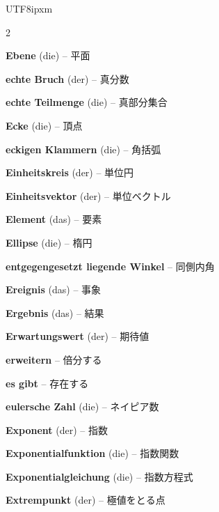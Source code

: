 \begin{CJK}{UTF8}{ipxm}
\begin{multicols}{2}
\par\nopagebreak
\textbf{Ebene} (die) -- 平面\dotfill\hyperref[e:308]{\pageref*{e:308}}\par
\textbf{echte Bruch} (der) -- 真分数\dotfill\hyperref[e:31]{\pageref*{e:31}}\par
\textbf{echte Teilmenge} (die) -- 真部分集合\dotfill\hyperref[e:99]{\pageref*{e:99}}\par
\textbf{Ecke} (die) -- 頂点\dotfill\hyperref[e:245]{\pageref*{e:245}}\par
\textbf{eckigen Klammern} (die) -- 角括弧\dotfill\hyperref[e:89]{\pageref*{e:89}}\par
\textbf{Einheitskreis} (der) -- 単位円\dotfill\hyperref[e:137]{\pageref*{e:137}}\par
\textbf{Einheitsvektor} (der) -- 単位ベクトル\dotfill\hyperref[e:303]{\pageref*{e:303}}\par
\textbf{Element} (das) -- 要素\dotfill\hyperref[e:97]{\pageref*{e:97}}\par
\textbf{Ellipse} (die) -- 楕円\dotfill\hyperref[e:314]{\pageref*{e:314}}\par
\textbf{entgegengesetzt liegende Winkel} -- 同側内角\dotfill\hyperref[e:169]{\pageref*{e:169}}\par
\textbf{Ereignis} (das) -- 事象\dotfill\hyperref[e:328]{\pageref*{e:328}}\par
\textbf{Ergebnis} (das) -- 結果\dotfill\hyperref[e:327]{\pageref*{e:327}}\par
\textbf{Erwartungswert} (der) -- 期待値\dotfill\hyperref[e:335]{\pageref*{e:335}}\par
\textbf{erweitern} -- 倍分する\dotfill\hyperref[e:38]{\pageref*{e:38}}\par
\textbf{es gibt} -- 存在する\dotfill\hyperref[e:353]{\pageref*{e:353}}\par
\textbf{eulersche Zahl} (die) -- ネイピア数\dotfill\hyperref[e:298]{\pageref*{e:298}}\par
\textbf{Exponent} (der) -- 指数\dotfill\hyperref[e:44]{\pageref*{e:44}}\par
\textbf{Exponentialfunktion} (die) -- 指数関数\dotfill\hyperref[e:130]{\pageref*{e:130}}\par
\textbf{Exponentialgleichung} (die) -- 指数方程式\dotfill\hyperref[e:84]{\pageref*{e:84}}\par
\textbf{Extrempunkt} (der) -- 極値をとる点\dotfill\hyperref[e:281]{\pageref*{e:281}}\par


\end{multicols}
\end{CJK}
